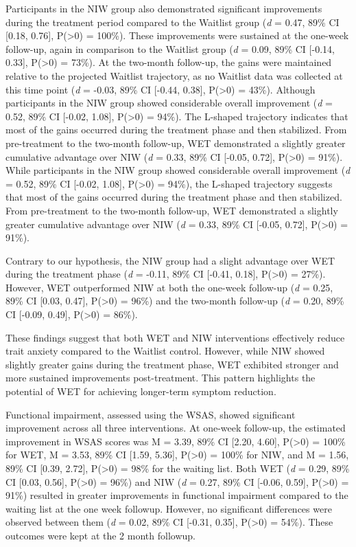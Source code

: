 \documentclass[
  man,floatsintext]{apa7}
\begin{document}
Participants in the NIW group also demonstrated significant improvements during the treatment period compared to the Waitlist group (\emph{d} = 0.47, 89\% CI {[}0.18, 0.76{]}, P(\textgreater0) = 100\%).
These improvements were sustained at the one-week follow-up, again in comparison to the Waitlist group (\emph{d} = 0.09, 89\% CI {[}-0.14, 0.33{]}, P(\textgreater0) = 73\%).
At the two-month follow-up, the gains were maintained relative to the projected Waitlist trajectory, as no Waitlist data was collected at this time point (\emph{d} = -0.03, 89\% CI {[}-0.44, 0.38{]}, P(\textgreater0) = 43\%).
Although participants in the NIW group showed considerable overall improvement (\emph{d} = 0.52, 89\% CI {[}-0.02, 1.08{]}, P(\textgreater0) = 94\%).
The L-shaped trajectory indicates that most of the gains occurred during the treatment phase and then stabilized.
From pre-treatment to the two-month follow-up, WET demonstrated a slightly greater cumulative advantage over NIW (\emph{d} = 0.33, 89\% CI {[}-0.05, 0.72{]}, P(\textgreater0) = 91\%).
While participants in the NIW group showed considerable overall improvement (\emph{d} = 0.52, 89\% CI {[}-0.02, 1.08{]}, P(\textgreater0) = 94\%), the L-shaped trajectory suggests that most of the gains occurred during the treatment phase and then stabilized.
From pre-treatment to the two-month follow-up, WET demonstrated a slightly greater cumulative advantage over NIW (\emph{d} = 0.33, 89\% CI {[}-0.05, 0.72{]}, P(\textgreater0) = 91\%).

Contrary to our hypothesis, the NIW group had a slight advantage over WET during the treatment phase (\emph{d} = -0.11, 89\% CI {[}-0.41, 0.18{]}, P(\textgreater0) = 27\%).
However, WET outperformed NIW at both the one-week follow-up (\emph{d} = 0.25, 89\% CI {[}0.03, 0.47{]}, P(\textgreater0) = 96\%) and the two-month follow-up (\emph{d} = 0.20, 89\% CI {[}-0.09, 0.49{]}, P(\textgreater0) = 86\%).

These findings suggest that both WET and NIW interventions effectively reduce trait anxiety compared to the Waitlist control.
However, while NIW showed slightly greater gains during the treatment phase, WET exhibited stronger and more sustained improvements post-treatment.
This pattern highlights the potential of WET for achieving longer-term symptom reduction.

Functional impairment, assessed using the WSAS, showed significant improvement across all three interventions.
At one-week follow-up, the estimated improvement in WSAS scores was M = 3.39, 89\% CI {[}2.20, 4.60{]}, P(\textgreater0) = 100\% for WET, M = 3.53, 89\% CI {[}1.59, 5.36{]}, P(\textgreater0) = 100\% for NIW, and M = 1.56, 89\% CI {[}0.39, 2.72{]}, P(\textgreater0) = 98\% for the waiting list.
Both WET (\emph{d} = 0.29, 89\% CI {[}0.03, 0.56{]}, P(\textgreater0) = 96\%) and NIW (\emph{d} = 0.27, 89\% CI {[}-0.06, 0.59{]}, P(\textgreater0) = 91\%) resulted in greater improvements in functional impairment compared to the waiting list at the one week followup.
However, no significant differences were observed between them (\emph{d} = 0.02, 89\% CI {[}-0.31, 0.35{]}, P(\textgreater0) = 54\%).
These outcomes were kept at the 2 month followup.
\end{document}
